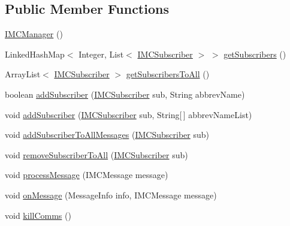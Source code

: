 \subsection*{Public Member Functions}
\begin{DoxyCompactItemize}
\item 
\hyperlink{classpt_1_1lsts_1_1asa_1_1managers_1_1IMCManager_ae5e396c9fe1fd0ed4957d2f2147d70fd}{I\+M\+C\+Manager} ()
\item 
Linked\+Hash\+Map$<$ Integer, List$<$ \hyperlink{interfacept_1_1lsts_1_1asa_1_1comms_1_1IMCSubscriber}{I\+M\+C\+Subscriber} $>$ $>$ \hyperlink{classpt_1_1lsts_1_1asa_1_1managers_1_1IMCManager_ab1042cb8058c3f03ae804872f63dde5c}{get\+Subscribers} ()
\item 
Array\+List$<$ \hyperlink{interfacept_1_1lsts_1_1asa_1_1comms_1_1IMCSubscriber}{I\+M\+C\+Subscriber} $>$ \hyperlink{classpt_1_1lsts_1_1asa_1_1managers_1_1IMCManager_aba6c95eb9db0143d10ec5629007ab93d}{get\+Subscribers\+To\+All} ()
\item 
boolean \hyperlink{classpt_1_1lsts_1_1asa_1_1managers_1_1IMCManager_abb51e536ed1b8455a675c1a9e092c95a}{add\+Subscriber} (\hyperlink{interfacept_1_1lsts_1_1asa_1_1comms_1_1IMCSubscriber}{I\+M\+C\+Subscriber} sub, String abbrev\+Name)
\item 
void \hyperlink{classpt_1_1lsts_1_1asa_1_1managers_1_1IMCManager_aa1a7211aa3a891aeaf2f28459874c6f1}{add\+Subscriber} (\hyperlink{interfacept_1_1lsts_1_1asa_1_1comms_1_1IMCSubscriber}{I\+M\+C\+Subscriber} sub, String\mbox{[}$\,$\mbox{]} abbrev\+Name\+List)
\item 
void \hyperlink{classpt_1_1lsts_1_1asa_1_1managers_1_1IMCManager_a194d3355aa07bb230462325b07bed9a2}{add\+Subscriber\+To\+All\+Messages} (\hyperlink{interfacept_1_1lsts_1_1asa_1_1comms_1_1IMCSubscriber}{I\+M\+C\+Subscriber} sub)
\item 
void \hyperlink{classpt_1_1lsts_1_1asa_1_1managers_1_1IMCManager_a02d0a2d80b2a4328aad0893517c9e3a9}{remove\+Subscriber\+To\+All} (\hyperlink{interfacept_1_1lsts_1_1asa_1_1comms_1_1IMCSubscriber}{I\+M\+C\+Subscriber} sub)
\item 
void \hyperlink{classpt_1_1lsts_1_1asa_1_1managers_1_1IMCManager_a3c67ff6f3099d49b86dc9ec620c07f48}{process\+Message} (I\+M\+C\+Message message)
\item 
void \hyperlink{classpt_1_1lsts_1_1asa_1_1managers_1_1IMCManager_ab5856ff159a64c7e179a1830590989b5}{on\+Message} (Message\+Info info, I\+M\+C\+Message message)
\item 
void \hyperlink{classpt_1_1lsts_1_1asa_1_1managers_1_1IMCManager_ab93d6de31234342a2f98dfac9e26aca3}{kill\+Comms} ()

\end{DoxyCompactItemize}
